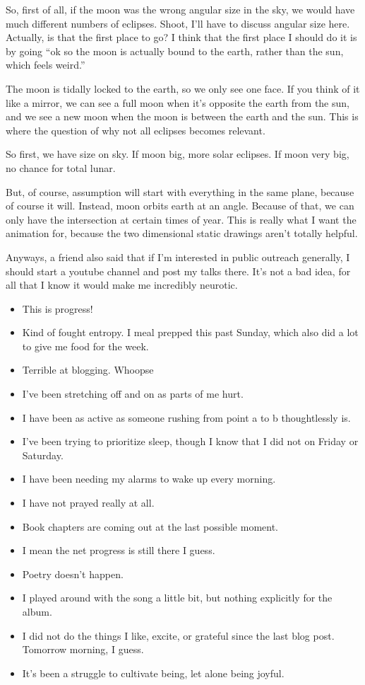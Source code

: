 \documentclass[12pt]{article}[titlepage]
\newcommand{\say}[1]{``#1''}
\newcommand{\1}{\={a}}
\newcommand{\2}{\={e}}
\newcommand{\3}{\={\i}}
\newcommand{\4}{\=o}
\newcommand{\5}{\=u}
\newcommand{\6}{\={A}}
\renewcommand{\,}{\textsuperscript{,}}
\begin{document}
So, first of all, if the moon was the wrong angular size in the sky, we would have much different numbers of eclipses.
Shoot, I'll have to discuss angular size here.
Actually, is that the first place to go?
I think that the first place I should do it is by going \say{ok so the moon is actually bound to the earth, rather than the sun, which feels weird.}

The moon is tidally locked to the earth, so we only see one face.
If you think of it like a mirror, we can see a full moon when it's opposite the earth from the sun, and we see a new moon when the moon is between the earth and the sun.
This is where the question of why not all eclipses becomes relevant.

So first, we have size on sky.
If moon big, more solar eclipses.
If moon very big, no chance for total lunar.

But, of course, assumption will start with everything in the same plane, because of course it will.
Instead, moon orbits earth at an angle.
Because of that, we can only have the intersection at certain times of year.
This is really what I want the animation for, because the two dimensional static drawings aren't totally helpful.

Anyways, a friend also said that if I'm interested in public outreach generally, I should start a youtube channel and post my talks there.
It's not a bad idea, for all that I know it would make me incredibly neurotic.

\begin{itemize}
\item This is progress!
\item Kind of fought entropy. I meal prepped this past Sunday, which also did a lot to give me food for the week.
\item Terrible at blogging. Whoopse
\item I've been stretching off and on as parts of me hurt.
\item I have been as active as someone rushing from point a to b thoughtlessly is.
\item I've been trying to prioritize sleep, though I know that I did not on Friday or Saturday.
\item I have been needing my alarms to wake up every morning.
\item I have not prayed really at all.
\item Book chapters are coming out at the last possible moment.
\item I mean the net progress is still there I guess.
\item Poetry doesn't happen.
\item I played around with the song a little bit, but nothing explicitly for the album.
\item I did not do the things I like, excite, or grateful since the last blog post. Tomorrow morning, I guess.
\item It's been a struggle to cultivate being, let alone being joyful.
\end{itemize}
\end{document}
